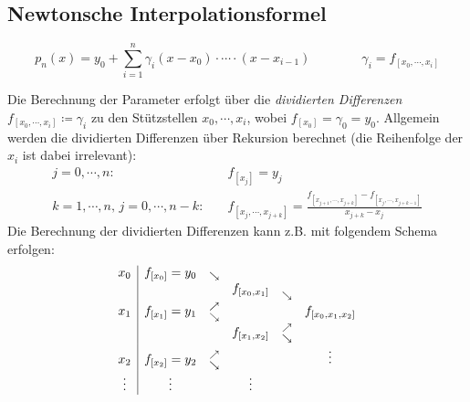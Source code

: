 		\subsection{Newtonsche Interpolationsformel}
			\begin{equation*}
				p_n(x) = y_0 + \sum_{i=1}^n \gamma_i (x - x_0) \cdot \cdots \cdot (x - x_{i-1}) \qquad\qquad \gamma_i = f_{[x_0, \cdots, x_i]}
			\end{equation*}

			Die Berechnung der Parameter erfolgt über die \textit{dividierten Differenzen} \( f_{[x_0, \cdots, x_i]} \coloneqq \gamma_i \) zu den Stützstellen \( x_0, \cdots, x_i \), wobei \( f_{[x_0]} = \gamma_0 = y_0 \). Allgemein werden die dividierten Differenzen über Rekursion berechnet (die Reihenfolge der \(x_i\) ist dabei irrelevant):
			\begin{align*}
				j = 0, \cdots, n:                         & \quad f_{[x_j]} = y_j                                                                                                      \\
				k = 1, \cdots, n,\, j = 0, \cdots, n - k: & \quad f_{[x_j, \cdots, x_{j+k}]} = \frac{f_{[x_{j + 1}, \cdots, x_{j+k}]} - f_{[x_j, \cdots, x_{j+k-1}]}}{{x_{j+k} - x_j}}
			\end{align*}
			Die Berechnung der dividierten Differenzen kann z.B. mit folgendem Schema erfolgen:
			\begin{equation*}
				\begin{array}{c | ccccc}
					x_0    & f_{[x_0]} = y_0 & \raisebox{-4pt}{\( \overset{\searrow}{} \)}                     &                                                                                                        \\
					       &                 &                                                                 & f_{[x_0, x_1]} & \raisebox{-7pt}{\( \overset{\searrow}{} \)}                     &                     \\
					x_1    & f_{[x_1]} = y_1 & \raisebox{-6pt}{\( \overset{\nearrow}{\overset{\searrow}{}} \)} &                &                                                                 & f_{[x_0, x_1, x_2]} \\
					       &                 &                                                                 & f_{[x_1, x_2]} & \raisebox{-6pt}{\( \overset{\nearrow}{\overset{\searrow}{}} \)} &                     \\
					x_2    & f_{[x_2]} = y_2 & \raisebox{-6pt}{\( \overset{\nearrow}{\overset{\searrow}{}} \)} &                &                                                                 & \vdots              \\
					\vdots & \vdots          &                                                                 & \vdots         &
				\end{array}
			\end{equation*}

